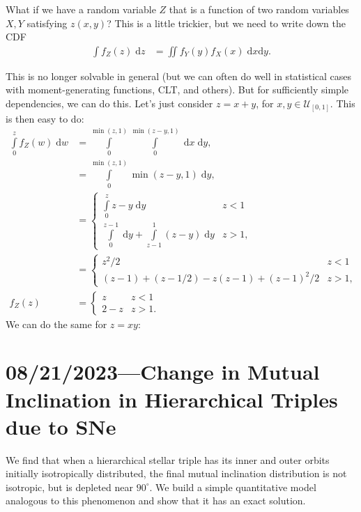 \documentclass[12pt]{article}
\newcommand*{\p}[1]{\left(#1\right)}
\begin{document}
What if we have a random variable $Z$ that is a function of two random variables
$X, Y$ satisfying $z(x, y)$? This is a little trickier, but we need to write
down the CDF
\begin{align}
    \int\limits f_Z(z)\;\mathrm{d}z
        &= \iint\limits f_Y(y)f_X(x)\;\mathrm{d}x\mathrm{d}y.
\end{align}

This is no longer solvable in general (but we can often do well in statistical
cases with moment-generating functions, CLT, and others). But for sufficiently
simple dependencies, we can do this. Let's just consider $z = x + y$, for $x, y
\in \mathcal{U}_{[0, 1]}$. This is then easy to do:
\begin{align}
    \int\limits_0^z f_Z(w)\;\mathrm{d}w
        &= \int\limits_0^{\min(z, 1)}
            \int\limits_{0}
                ^{\min(z - y, 1)}\;\mathrm{d}x\;\mathrm{d}y,\\
        &= \int\limits_0^{\min(z, 1)}
            \min\p{z - y, 1}\;\mathrm{d}y,\\
        &=
        \begin{cases}
            \int\limits_0^z
                z - y\;\mathrm{d}y & z < 1\\[10pt]
            \int\limits_0^{z - 1}
                \;\mathrm{d}y +
            \int\limits_{z - 1}^1
                (z - y)\;\mathrm{d}y & z > 1,
        \end{cases}\\
        &=
        \begin{cases}
            z^2 / 2 & z < 1\\
            (z - 1) + (z - 1/2) - z(z-1) + (z - 1)^2/2 & z > 1,
        \end{cases}\\
    f_Z(z) &=
        \begin{cases}
            z & z < 1\\
            2 - z & z > 1.
        \end{cases}
\end{align}
We can do the same for $z = xy$:

\section{08/21/2023---Change in Mutual Inclination in Hierarchical Triples due to SNe}

We find that when a hierarchical stellar triple has its inner and outer orbits
initially isotropically distributed, the final mutual inclination distribution
is not isotropic, but is depleted near $90^\circ$. We build a simple
quantitative model analogous to this phenomenon and show that it has an exact
solution.
\end{document}
